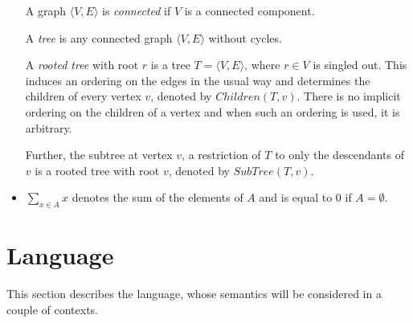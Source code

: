 \documentclass{article}
\begin{document}
\begin{itemize}
  A graph $\langle V, E \rangle$ is \emph{connected} if $V$ is a connected component.

  A \emph{tree} is any connected graph $\langle V, E \rangle$ without cycles.

  A \emph{rooted tree} with root $r$ is a tree $T = \langle V, E \rangle$, where $r \in V$ is singled out. This induces an ordering on the edges in the usual way and determines the children of every vertex $v$, denoted by $Children(T, v)$. There is no implicit ordering on the children of a vertex and when such an ordering is used, it is arbitrary.

  Further, the subtree at vertex $v$, a restriction of $T$ to only the descendants of $v$ is a rooted tree with root $v$, denoted by $SubTree(T, v)$.

\item $\sum_{x \in A}x$ denotes the sum of the elements of $A$ and is equal to $0$ if $A = \emptyset$.
\end{itemize}

\section{Language}
This section describes the language, whose semantics will be considered in a couple of contexts.
\end{document}

